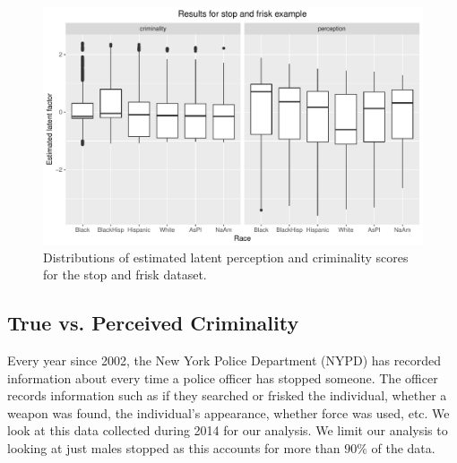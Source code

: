 \begin{figure}[!th]
\begin{center}
\vspace{-1ex}
\centerline{\includegraphics[width=\columnwidth]{stopandfrisk_output.pdf}}
\vspace{-2ex}
\caption{Distributions of estimated latent perception and criminality scores for the stop and frisk dataset.\label{figure.stop_and_frisk_output}\vspace{-5ex}}
\vspace{-2ex}
\end{center}
\end{figure}


\subsection{True vs. Perceived Criminality}
\label{sec:true-vs.-perceived}
Every year since 2002, the New York Police Department (NYPD) has recorded information about every time a police officer has stopped someone. The officer records information such as if they searched or frisked the individual, whether a weapon was found, the individual's appearance, whether force was used, etc. We look at this data collected during 2014 for our analysis. We limit our analysis to looking at just males stopped as this accounts for more than $90\%$ of the data.


